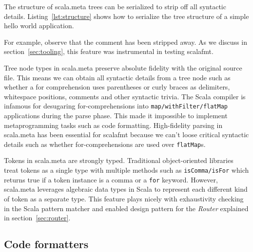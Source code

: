 The structure of scala.meta trees can be serialized to strip off all syntactic details.
Listing~\ref{lst:structure} shows how to serialize the tree structure of a simple hello world application.

For example, observe that the comment has been stripped away.
As we discuss in section~\ref{sec:tooling}, this feature was instrumental in testing scalafmt.

Tree node types in scala.meta preserve absolute fidelity with the original source file.
This means we can obtain all syntactic details from a tree node such as whether a for comprehension uses parentheses or curly braces as delimiters, whitespace positions, comments and other syntactic trivia.
The Scala compiler is infamous for desugaring for-comprehensions into \texttt{map/withFilter/flatMap} applications during the parse phase.
This made it impossible to implement metaprogramming tasks such as code formatting.
High-fidelity parsing in scala.meta has been essential for scalafmt because we can't loose critical syntactic details such as whether for-comprehensions are used over \texttt{flatMap}s.

Tokens in scala.meta are strongly typed.
Traditional object-oriented libraries treat tokens as a single type with multiple methods such as \texttt{isComma/isFor} which returns true if a token instance is a comma or a \texttt{for} keyword.
However, scala.meta leverages algebraic data types in Scala to represent each different kind of token as a separate type.
This feature plays nicely with exhaustivity checking in the Scala pattern matcher and enabled design pattern for the \emph{Router} explained in section~\ref{sec:router}.



\subsection{Code formatters}
%

